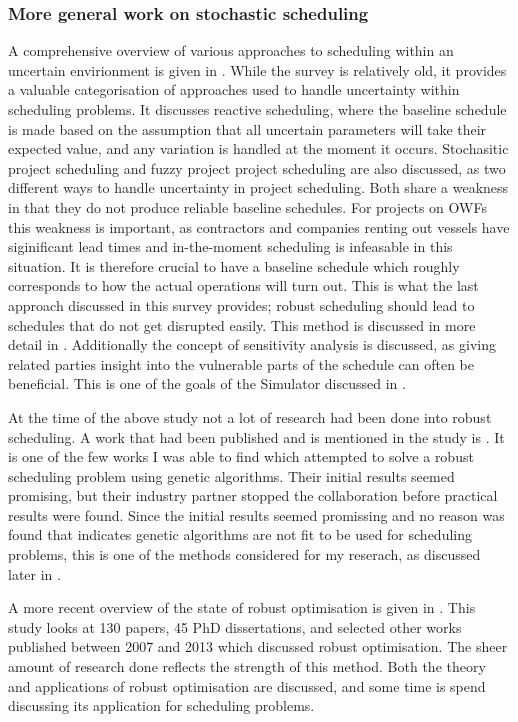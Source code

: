 \documentclass[a4paper,12pt]{article}
\begin{document}
\subsubsection{More general work on stochastic scheduling} \label{sss:stoch}
A comprehensive overview of various approaches to scheduling within an uncertain envirionment is given in \cite{herroelen2005project}. While the survey is relatively old, it provides a valuable categorisation of approaches used to handle uncertainty within scheduling problems. It discusses reactive scheduling, where the baseline schedule is made based on the assumption that all uncertain parameters will take their expected value, and any variation is handled at the moment it occurs. Stochasitic project scheduling and fuzzy project project scheduling are also discussed, as two different ways to handle uncertainty in project scheduling. Both share a weakness in that they do not produce reliable baseline schedules. For projects on OWFs this weakness is important, as contractors and companies renting out vessels have siginificant lead times and in-the-moment scheduling is infeasable in this situation. It is therefore crucial to have a baseline schedule which roughly corresponds to how the actual operations will turn out. This is what the last approach discussed in this survey provides; robust scheduling should lead to schedules that do not get disrupted easily. This method is discussed in more detail in . Additionally the concept of sensitivity analysis is discussed, as giving related parties insight into the vulnerable parts of the schedule can often be beneficial. This is one of the goals of the Simulator discussed in . 

At the time of the above study not a lot of research had been done into robust scheduling. A work that had been published and is mentioned in the study is \cite{sevaux2002genetic}. It is one of the few works I was able to find which attempted to solve a robust scheduling problem using genetic algorithms. Their initial results seemed promising, but their industry partner stopped the collaboration before practical results were found. Since the initial results seemed promissing and no reason was found that indicates genetic algorithms are not fit to be used for scheduling problems, this is one of the methods considered for my reserach, as discussed later in .

\bigskip

A more recent overview of the state of robust optimisation is given in \cite{gabrel2014recent}. This study looks at 130 papers, 45 PhD dissertations, and selected other works published between 2007 and 2013 which discussed robust optimisation. The sheer amount of research done reflects the strength of this method. Both the theory and applications of robust optimisation are discussed, and some time is spend discussing its application for scheduling problems. 
\end{document}
